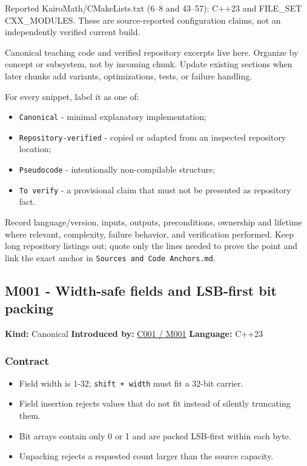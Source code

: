 Reported KairoMath/CMakeLists.txt (6--8 and 43--57): C++23 and FILE\_SET CXX\_MODULES. These are source-reported configuration claims, not an independently verified current build.

Canonical teaching code and verified repository excerpts live here. Organize by concept or subsystem, not by incoming chunk. Update existing sections when later chunks add variants, optimizations, tests, or failure handling.

For every snippet, label it as one of:

\begin{itemize}
\tightlist
\item
  \texttt{Canonical} - minimal explanatory implementation;
\item
  \texttt{Repository-verified} - copied or adapted from an inspected repository location;
\item
  \texttt{Pseudocode} - intentionally non-compilable structure;
\item
  \texttt{To\ verify} - a provisional claim that must not be presented as repository fact.
\end{itemize}

Record language/version, inputs, outputs, preconditions, ownership and lifetime where relevant, complexity, failure behavior, and verification performed. Keep long repository listings out; quote only the lines needed to prove the point and link the exact anchor in \texttt{Sources\ and\ Code\ Anchors.md}.

\subsection{M001 - Width-safe fields and LSB-first bit packing}\label{appendix-4e2236f53445-m001---width-safe-fields-and-lsb-first-bit-packing}

\textbf{Kind:} Canonical \textbf{Introduced by:} \hyperref[01-foundations-i-ch001-from-a-signal-to-an-interpretation]{C001 / M001} \textbf{Language:} C++23

\subsubsection{Contract}\label{appendix-4e2236f53445-contract}

\begin{itemize}
\tightlist
\item
  Field width is 1-32; \texttt{shift\ +\ width} must fit a 32-bit carrier.
\item
  Field insertion rejects values that do not fit instead of silently truncating them.
\item
  Bit arrays contain only 0 or 1 and are packed LSB-first within each byte.
\item
  Unpacking rejects a requested count larger than the source capacity.
\end{itemize}

